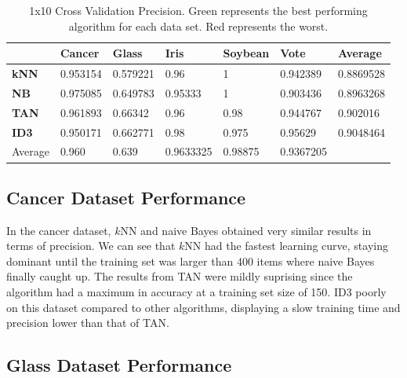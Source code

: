 \documentclass{article}
\begin{document}
		\begin{table}[h!] 
			\centering
			
			\begin{tabular}  { | l | l | l | l | l | l | l | }
				\hline
			\rowcolor{gray}	& \textbf{Cancer} & \textbf{Glass} & \textbf{Iris} & \textbf{Soybean} & \textbf{Vote} & Average \\
				\hline
				\cellcolor{gray} \textbf{kNN} & 0.953154  & \cellcolor{red}0.579221 & 0.96 & \cellcolor{green}1 & 0.942389 & \cellcolor{red}0.8869528  \\
				\hline
			\cellcolor{gray}	\textbf{NB} & \cellcolor{green}0.975085 & 0.649783 &\cellcolor{red} 0.95333 & \cellcolor{green}1 & \cellcolor{red}0.903436 & \cellcolor{lightgray}0.8963268   \\
				\hline
			\cellcolor{gray}	\textbf{TAN} & 0.961893 & \cellcolor{green}0.66342 & 0.96 & 0.98 & 0.944767 & \cellcolor{lightgray}0.902016 \\
				\hline
			\cellcolor{gray}	\textbf{ID3} & \cellcolor{red}0.950171 & 0.662771 & \cellcolor{green}0.98 & \cellcolor{red}0.975 & \cellcolor{green}0.95629 & \cellcolor{green}0.9048464 \\
				\hline
			\rowcolor{lightgray}	\cellcolor{gray} Average & 0.960 & 0.639 & 0.9633325 & 0.98875 & 0.9367205 & \\
				\hline
				
			\end{tabular}
			\caption{1x10 Cross Validation Precision. Green represents the best performing algorithm for each data set. Red represents the worst.}
			\label{table}
		\end{table}
		
		\subsection{Cancer Dataset Performance}
		
			In the cancer dataset, $k$NN and naive Bayes obtained very similar results in terms of precision. We can see that $k$NN had the fastest learning curve, staying dominant until the training set was larger than 400 items where naive Bayes finally caught up. The results from TAN were mildly suprising since the algorithm had a maximum in accuracy at a training set size of 150. ID3 poorly on this dataset compared to other algorithms, displaying a slow training time and precision lower than that of TAN.
		
		\subsection{Glass Dataset Performance}
		
\end{document}
